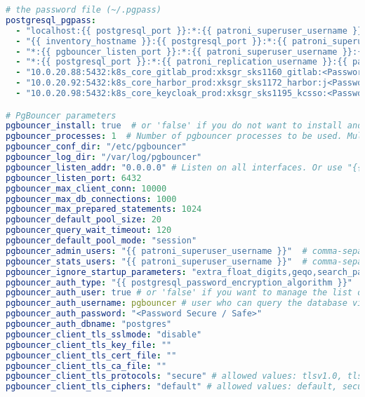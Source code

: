 \begin{flushleft}
\begin{lstlisting}[language=yaml, caption=Testsystem - Deployment - main.yml,captionpos=b,label={lst:testsystem-deployment-main.yml},breaklines=true]
# the password file (~/.pgpass)
postgresql_pgpass:
  - "localhost:{{ postgresql_port }}:*:{{ patroni_superuser_username }}:{{ patroni_superuser_password }}"
  - "{{ inventory_hostname }}:{{ postgresql_port }}:*:{{ patroni_superuser_username }}:{{ patroni_superuser_password }}"
  - "*:{{ pgbouncer_listen_port }}:*:{{ patroni_superuser_username }}:{{ patroni_superuser_password }}"
  - "*:{{ postgresql_port }}:*:{{ patroni_replication_username }}:{{ patroni_replication_password }}"
  - "10.0.20.88:5432:k8s_core_gitlab_prod:xksgr_sks1160_gitlab:<Password Secure / Safe>"
  - "10.0.20.92:5432:k8s_core_harbor_prod:xksgr_sks1172_harbor:j<Password Secure / Safe>"
  - "10.0.20.98:5432:k8s_core_keycloak_prod:xksgr_sks1195_kcsso:<Password Secure / Safe>"

# PgBouncer parameters
pgbouncer_install: true  # or 'false' if you do not want to install and configure the pgbouncer service
pgbouncer_processes: 1  # Number of pgbouncer processes to be used. Multiple processes use the so_reuseport option for better performance.
pgbouncer_conf_dir: "/etc/pgbouncer"
pgbouncer_log_dir: "/var/log/pgbouncer"
pgbouncer_listen_addr: "0.0.0.0" # Listen on all interfaces. Or use "{{ inventory_hostname }}" to listen on a specific IP address.
pgbouncer_listen_port: 6432
pgbouncer_max_client_conn: 10000
pgbouncer_max_db_connections: 1000
pgbouncer_max_prepared_statements: 1024
pgbouncer_default_pool_size: 20
pgbouncer_query_wait_timeout: 120
pgbouncer_default_pool_mode: "session"
pgbouncer_admin_users: "{{ patroni_superuser_username }}"  # comma-separated list of users, who are allowed to change settings
pgbouncer_stats_users: "{{ patroni_superuser_username }}"  # comma-separated list of users who are just allowed to use SHOW command
pgbouncer_ignore_startup_parameters: "extra_float_digits,geqo,search_path"
pgbouncer_auth_type: "{{ postgresql_password_encryption_algorithm }}"
pgbouncer_auth_user: true # or 'false' if you want to manage the list of users for authentication in the database via userlist.txt
pgbouncer_auth_username: pgbouncer # user who can query the database via the user_search function
pgbouncer_auth_password: "<Password Secure / Safe>"
pgbouncer_auth_dbname: "postgres"
pgbouncer_client_tls_sslmode: "disable"
pgbouncer_client_tls_key_file: ""
pgbouncer_client_tls_cert_file: ""
pgbouncer_client_tls_ca_file: ""
pgbouncer_client_tls_protocols: "secure" # allowed values: tlsv1.0, tlsv1.1, tlsv1.2, tlsv1.3, all, secure (tlsv1.2,tlsv1.3)
pgbouncer_client_tls_ciphers: "default" # allowed values: default, secure, fast, normal, all (not recommended)


\end{lstlisting}
\end{flushleft}
